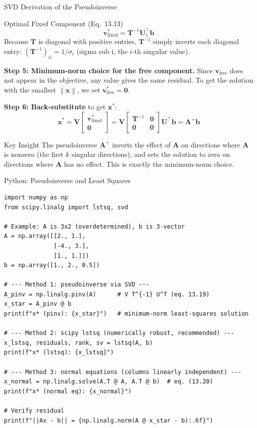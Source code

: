 \documentclass[aspectratio=169,10pt]{beamer}
\newcommand{\bx}{\mathbf{x}}
\newcommand{\bb}{\mathbf{b}}
\newcommand{\bA}{\mathbf{A}}
\newcommand{\bU}{\mathbf{U}}
\newcommand{\bV}{\mathbf{V}}
\newcommand{\bT}{\mathbf{T}}
\newcommand{\norm}[1]{\left\|#1\right\|}
\begin{document}
\begin{frame}[allowframebreaks]{SVD Derivation of the Pseudoinverse}
  \begin{block}{Optimal Fixed Component (Eq.~13.13)}
    \[
      \mathbf{v}^*_{\text{fixed}} = \bT^{-1}\bU_1^{\top}\bb
    \]
    Because $\bT$ is diagonal with positive entries, $\bT^{-1}$ simply inverts each
    diagonal entry: $(\bT^{-1})_{ii} = 1/\sigma_i$ (sigma sub i, the $i$-th singular value).
  \end{block}

  \textbf{Step 5: Minimum-norm choice for the free component.}  Since
  $\mathbf{v}_{\text{free}}$ does not appear in the objective, any value gives the
  same residual.  To get the solution with the smallest $\norm{\bx}$, we set
  $\mathbf{v}^*_{\text{free}} = \mathbf{0}$.

  \textbf{Step 6: Back-substitute} to get $\bx^*$:
  \[
    \bx^* = \bV\begin{bmatrix}\mathbf{v}^*_{\text{fixed}}\\\mathbf{0}\end{bmatrix}
    = \bV\begin{bmatrix}\bT^{-1}&\mathbf{0}\\\mathbf{0}&\mathbf{0}\end{bmatrix}\bU^{\top}\bb
    = \bA^+\bb
  \]

  \begin{alertblock}{Key Insight}
    The pseudoinverse $\bA^+$ inverts the effect of $\bA$ on directions where $\bA$
    is nonzero (the first $k$ singular directions), and sets the solution to zero on
    directions where $\bA$ has no effect.  This is exactly the minimum-norm choice.
  \end{alertblock}

\end{frame}

\begin{frame}[fragile]{Python: Pseudoinverse and Least Squares}
\begin{lstlisting}[caption={Unconstrained least-squares via pseudoinverse (NumPy/SciPy)}]
import numpy as np
from scipy.linalg import lstsq, svd

# Example: A is 3x2 (overdetermined), b is 3-vector
A = np.array([[2., 1.],
              [-4., 3.],
              [1., 1.]])
b = np.array([1., 2., 0.5])

# --- Method 1: pseudoinverse via SVD ---
A_pinv = np.linalg.pinv(A)      # V T^{-1} U^T (eq. 13.19)
x_star = A_pinv @ b
print(f"x* (pinv): {x_star}")   # minimum-norm least-squares solution

# --- Method 2: scipy lstsq (numerically robust, recommended) ---
x_lstsq, residuals, rank, sv = lstsq(A, b)
print(f"x* (lstsq): {x_lstsq}")

# --- Method 3: normal equations (columns linearly independent) ---
x_normal = np.linalg.solve(A.T @ A, A.T @ b)  # eq. (13.20)
print(f"x* (normal eq): {x_normal}")

# Verify residual
print(f"||Ax - b|| = {np.linalg.norm(A @ x_star - b):.6f}")
\end{lstlisting}
\end{frame}
\end{document}
